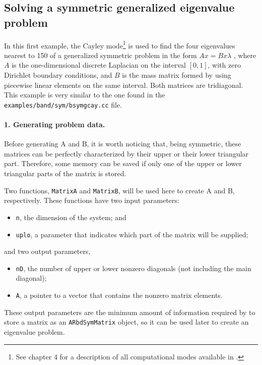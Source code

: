 \subsection{Solving a symmetric generalized eigenvalue problem}

In this first example, the Cayley mode\footnote{See chapter 4 for a description of all computational modes available in \ARPP{}.} is used to find the four eigenvalues nearest to 150 of a generalized symmetric problem in the form $Ax = Bx\lambda$ , where $A$ is the one-dimensional discrete Laplacian on the interval $[0, 1]$, with zero Dirichlet boundary conditions, and $B$ is the mass matrix formed by using piecewise linear elements on the same interval. Both matrices are tridiagonal. This example is very similar to the one found in the \texttt{examples/band/sym/bsymgcay.cc} file.

\paragraph{1. Generating problem data.}

Before generating A and B, it is worth noticing that, being symmetric, these matrices can be perfectly characterized by their upper or their lower triangular part. Therefore, some memory can be saved if only one of the upper or lower triangular parts of the matrix is stored.

Two functions, \texttt{MatrixA} and \texttt{MatrixB}, will be used here to create A and B, respectively. These functions have two input parameters:
\begin{itemize}
	\item \texttt{n}, the dimension of the system; and 
	\item \texttt{uplo}, a parameter that indicates which part of the matrix will be supplied;
\end{itemize}
and two output parameters,
\begin{itemize}
	\item \texttt{nD}, the number of upper or lower nonzero diagonals (not including the main diagonal);
	\item \texttt{A}, a pointer to a vector that contains the nonzero matrix elements.
\end{itemize}

These output parameters are the minimum amount of information required by \ARPP{} to store a matrix as an \texttt{ARbdSymMatrix} object, so it can be used later to create an eigenvalue problem.

